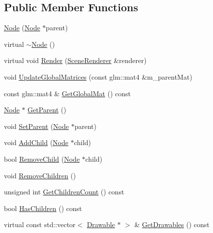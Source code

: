 \subsection*{Public Member Functions}
\begin{DoxyCompactItemize}
\item 
\mbox{\hyperlink{classec_1_1_node_a99fb4715fbc3f193ad5ed88dff15cd0e}{Node}} (\mbox{\hyperlink{classec_1_1_node}{Node}} $\ast$parent)
\item 
virtual \mbox{\hyperlink{classec_1_1_node_a6b2dfa6d2490ec46a5d15a326780889b}{$\sim$\+Node}} ()
\item 
virtual void \mbox{\hyperlink{classec_1_1_node_ac606be4f6d5a899a0b9679b6767ff109}{Render}} (\mbox{\hyperlink{classec_1_1_scene_renderer}{Scene\+Renderer}} \&renderer)
\item 
void \mbox{\hyperlink{classec_1_1_node_ac9970ec0ec03e130da59d0d5376a9855}{Update\+Global\+Matrices}} (const glm\+::mat4 \&m\+\_\+parent\+Mat)
\item 
const glm\+::mat4 \& \mbox{\hyperlink{classec_1_1_node_aafbc9c31eb710b1ac22834792e039435}{Get\+Global\+Mat}} () const
\item 
\mbox{\hyperlink{classec_1_1_node}{Node}} $\ast$ \mbox{\hyperlink{classec_1_1_node_a88919835b03a7055f4c1c50c68b83fac}{Get\+Parent}} ()
\item 
void \mbox{\hyperlink{classec_1_1_node_abda1732f28b0f81df2028d889eb73bdf}{Set\+Parent}} (\mbox{\hyperlink{classec_1_1_node}{Node}} $\ast$parent)
\item 
void \mbox{\hyperlink{classec_1_1_node_a769243d9432b14a0c4362c98f4c89a73}{Add\+Child}} (\mbox{\hyperlink{classec_1_1_node}{Node}} $\ast$child)
\item 
bool \mbox{\hyperlink{classec_1_1_node_a65f938c730afc4f5b4fcceb64ac84416}{Remove\+Child}} (\mbox{\hyperlink{classec_1_1_node}{Node}} $\ast$child)
\item 
void \mbox{\hyperlink{classec_1_1_node_ae91a96819729bc06c17870fa8cca2129}{Remove\+Children}} ()
\item 
unsigned int \mbox{\hyperlink{classec_1_1_node_afc08689badadadcbbca919858994d30b}{Get\+Children\+Count}} () const
\item 
bool \mbox{\hyperlink{classec_1_1_node_add6f4b234aebaeb7d1e76d42234b9831}{Has\+Children}} () const
\item 
virtual const std\+::vector$<$ \mbox{\hyperlink{classec_1_1_drawable}{Drawable}} $\ast$ $>$ \& \mbox{\hyperlink{classec_1_1_node_ab1cd50204e1b38c9c1b31e46d13ea915}{Get\+Drawables}} () const
\item 

\end{DoxyCompactItemize}

